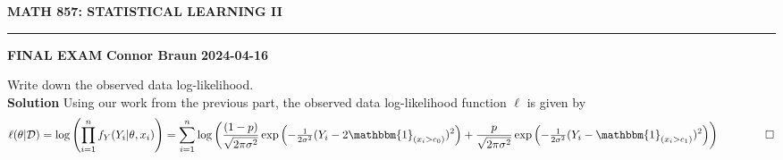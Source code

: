 \documentclass[10pt]{article}
\newcommand{\bp}[1]{\left({#1}\right)}
\newcommand{\1}[1]{\mathbbm{1}_{#1}}
\newcommand{\mc}[1]{\mathcal{#1}}
\begin{document}
    \begin{center}
        {\bf\large{MATH 857: STATISTICAL LEARNING II}}
        \smallskip
        \hrule
        \smallskip
        {\bf FINAL EXAM} \hfill {\bf Connor Braun} \hfill {\bf 2024-04-16}
    \end{center}
 Write down the observed data log-likelihood.\\[5pt]
{\bf Solution}\hspace{5pt} Using our work from the previous part, the observed data log-likelihood function $\ell$ is given by
\begin{align*}
    \ell(\theta|\mc{D})=\log\left(\prod_{i=1}^nf_Y(Y_i|\theta,x_i)\right)=\sum_{i=1}^n\log\left(\frac{(1-p)}{\sqrt{2\pi\sigma^2}}\exp\bp{-\tfrac{1}{2\sigma^2}(Y_i-2\mathbbm{1}_{(x_i>c_0)})^2}+\frac{p}{\sqrt{2\pi\sigma^2}}\exp\bp{-\tfrac{1}{2\sigma^2}(Y_i-\mathbbm{1}_{(x_i>c_1)})^2}\right)\tag*{$\qed$}
\end{align*}
\end{document}
